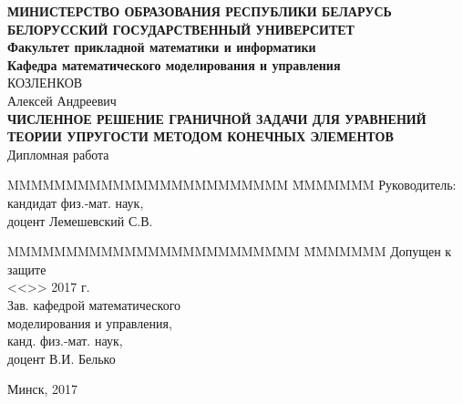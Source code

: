 \documentclass[a4paper, 14pt]{extreport}
\begin{document}
\renewcommand{\figurename}{Рисунок} %
\renewcommand{\contentsname}{\hfill\Large ОГЛАВЛЕНИЕ \hfill}
\renewcommand{\cftaftertoctitle}{\hfill}




\begin{titlepage}
    \begin{center}
        \normalsize {\bf МИНИСТЕРСТВО ОБРАЗОВАНИЯ РЕСПУБЛИКИ БЕЛАРУСЬ} \\
        \vspace{0.5cm}
        \normalsize {\bf БЕЛОРУССКИЙ ГОСУДАРСТВЕННЫЙ УНИВЕРСИТЕТ} \\
        \vspace{0.5cm}
        \normalsize {\bf Факультет прикладной математики и информатики} \\
        \vspace{0.5cm}
        \normalsize {\bf Кафедра математического моделирования и управления} \\
        \vspace{2cm}
        КОЗЛЕНКОВ \\
        Алексей Андреевич \\
        \vspace{1cm}
        \normalsize {\bf ЧИСЛЕННОЕ РЕШЕНИЕ ГРАНИЧНОЙ ЗАДАЧИ ДЛЯ УРАВНЕНИЙ ТЕОРИИ УПРУГОСТИ МЕТОДОМ
        КОНЕЧНЫХ ЭЛЕМЕНТОВ}\\
        \vspace{1cm}
        \normalsize Дипломная работа \\
        \vspace{1.5cm}
        \begin{tabbing}
            MMMMMMMMMMMMMMMMMMMMMMMM \= MMMMMMM \kill
            \> Руководитель: \\
            \>  кандидат физ.-мат. наук, \\
            \> доцент Лемешевский С.В. 
        \end{tabbing}
        \begin{tabbing}
            MMMMMMMMMMMMMMMMMMMMMMMMM \= MMMMMMM \kill
            Допущен к защите \>  \\
            <<\underline{\hspace{1cm}}>> \underline{\hspace{3.3cm}} 2017 г.
\\
			Зав. кафедрой математического \\
			моделирования и управления, \\
			канд. физ.-мат. наук,		\\	
			доцент В.И. Белько
        \end{tabbing}

        \vspace{1cm}

        \large Минск, 2017
    \end{center}
    
\end{titlepage}
\end{document}
